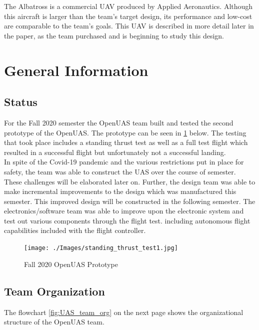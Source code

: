 \documentclass{article}
\begin{document}
\noindent The Albatross is a commercial UAV produced by Applied Aeronautics. Although this aircraft is larger than the team's target design, its performance and low-cost are comparable to the team's goals. This UAV is described in more detail later in the paper, as the team purchased and is beginning to study this design. \\


\section{General Information}

\subsection{Status}
For the Fall 2020 semester the OpenUAS team built and tested the second prototype of the OpenUAS. The prototype can be seen in \ref{fig:UAS_2.0_model} below. The testing that took place includes a standing thrust test as well as a full test flight which resulted in a successful flight but unfortunately not a successful landing. \\

In spite of the Covid-19 pandemic and the various restrictions put in place for safety, the team was able to construct the UAS over the course of semester. These challenges will be elaborated later on. Further, the design team was able to make incremental improvements to the design which was manufactured this semester. This improved design will be constructed in the following semester. The electronics/software team was able to improve upon the electronic system and test out various components through the flight test. including autonomous flight capabilities included with the flight controller.

\begin{figure}[hbt!]
\centering
\texttt{[image: ./Images/standing\_thrust\_test1.jpg]}
\caption{Fall 2020 OpenUAS Prototype}
\label{fig:UAS_2.0_model}
\end{figure}

\subsection{Team Organization}
The flowchart \ref{fig:UAS_team_org} on the next page shows the organizational structure of the OpenUAS team.

\newpage
\end{document}
